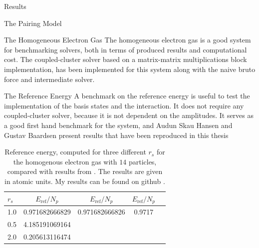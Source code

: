 \documentclass[twoside,english]{uiofysmaster}
\begin{document}
\begin{chapter}{Results}
\begin{section}{The Pairing Model}
	\end{section}

	\newpage

	\begin{section}{The Homogeneous Electron Gas}
		The homogeneous electron gas is a good system for benchmarking solvers, both in terms of produced results and computational cost. The coupled-cluster solver based on a matrix-matrix multiplications block implementation, has been implemented for this system along with the naive bruto force and intermediate solver. 

		\begin{subsection}{The Reference Energy}
			A benchmark on the reference energy is useful to test the implementation of the basis states and the interaction. It does not require any coupled-cluster solver, because it is not dependent on the amplitudes. It serves as a good first hand benchmark for the system, and Audun Skau Hansen and Gustav Baardsen \cite{Baardsen,Audun} present results that have been reproduced in this thesis
			\begin{table}[H]
				\begin{center}
					\begin{tabular}[center]{l | c  c  c  r}
						$r_s$ & $E_{\text{ref}} / N_p$ & $E_{\text{ref}} / N_p$ \cite{Baardsen} & $E_{\text{ref}} / N_p$ \cite{Audun} \\
						\hline
						1.0 & 0.971682666829 & 0.971682666826 & 0.9717 \\
						0.5 & 4.185191069164 &  &  \\
						2.0 & 0.205613116474 &  &  
					\end{tabular}
				\end{center}
				\caption{Reference energy, computed for three different $r_s$ for the homogenous electron gas with $14$ particles, compared with results from \cite{Baardsen,Audun}. The results are given in atomic units. My results can be found on github \cite{WholmenGithub}.}
				\label{table:ReferenceEnergyHEG}
			\end{table}

		\end{subsection}


\end{section}
\end{chapter}
\end{document}
